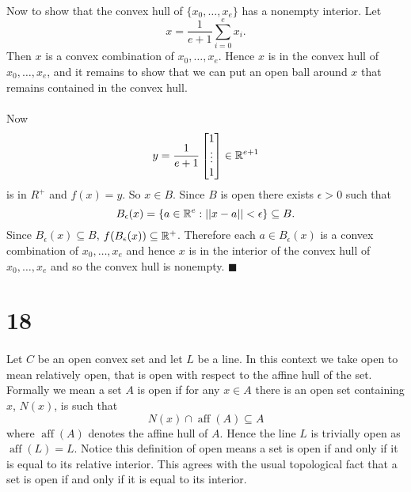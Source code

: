 \documentclass[letterpaper,12pt,oneside,onecolumn]{article}
\DeclareMathOperator{\aff}{aff}
\begin{document}
\paragraph{}
Now to show that the convex hull of $\{x_0, \dots, x_e\}$ has a nonempty interior. Let $$x = \frac{1}{e+1}\sum_{i=0}^e x_i.$$
Then $x$ is a convex combination of $x_0, \dots, x_e$. Hence $x$ is in the convex hull of $x_0, \dots, x_e$, and it remains to show that we can put an open ball around $x$ that remains contained in the convex hull.
\paragraph{}
 Now $$y = \frac{1}{e+1}\begin{bmatrix}1\\ \vdots \\ 1\end{bmatrix} \in \mathbb{R}^{e+1}$$ is in $R^+$ and $f(x) = y$. So $x \in B$. Since $B$ is open there exists $\epsilon >0$ such that $$B_\epsilon(x) = \{a \in \mathbb{R}^e : ||x-a|| < \epsilon\} \subseteq B.$$
Since $B_\epsilon(x) \subseteq B$, $f(B_\epsilon(x)) \subseteq \mathbb{R}^+$. Therefore each $a \in B_\epsilon(x)$ is a convex combination of $x_0, \dots, x_e$ and hence $x$ is in the interior of the convex hull of $x_0, \dots, x_e$ and so the convex hull is nonempty. $\blacksquare$
\section*{18}
\paragraph{}
Let $C$ be an open convex set and let $L$ be a line. In this context we take open to mean relatively open, that is open with respect to the affine hull of the set. Formally we mean a set $A$ is open if for any $x \in A$ there is an open set containing $x$, $N(x)$, is such that
$$N(x) \cap \aff(A) \subseteq A$$
where $\aff(A)$ denotes the affine hull of $A$. Hence the line $L$ is trivially open as $\aff(L) = L$. Notice this definition of open means a set is open if and only if it is equal to its relative interior. This agrees with the usual topological fact that a set is open if and only if it is equal to its interior.
\end{document}
